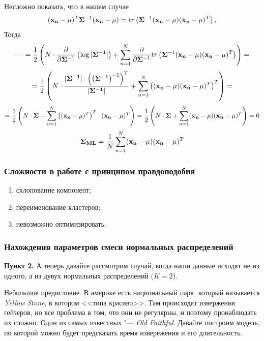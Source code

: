 \begin{Solution}
\[ \]
Несложно показать, что в нашем случае 
\[
({\bf x_n} -\mu)^T {\bf {\bf \Sigma}}^{-1} ({\bf x_n} -\mu) = tr\left({\bf {\bf \Sigma}}^{-1} ({\bf x_n} -\mu)({\bf x_n} -\mu)^T\right), 
\]
Тогда
\[
\dots = 
  \frac{1}{2} \left(N \cdot \frac{\partial}{\partial {\bf \Sigma}^{-1}} \left(\log |{\bf {\bf \Sigma}^{-1}}|\right) +  \sum\limits_{n=1}^{N}\frac{\partial}{\partial {\bf \Sigma}^{-1}} tr\left({\bf {\bf \Sigma}}^{-1} ({\bf x_n} -\mu)({\bf x_n} -\mu)^T\right) \right) =
\]
\[
= \frac{1}{2} \left(N \cdot \frac{|{\bf {\bf \Sigma}^{-1}}| \cdot \left(\left( {\bf {\bf \Sigma}^{-1}}\right)^{-1}\right)^T }{|{\bf {\bf \Sigma}^{-1}}|}
+  \sum\limits_{n=1}^{N} \left(({\bf x_n} -\mu)({\bf x_n} -\mu)^T\right)^T \right) =
\]
\[ =
\frac{1}{2} \left(N \cdot {\bf {\bf \Sigma}} + \sum\limits_{n=1}^{N}\left(({\bf x_n} -\mu)^T\right)^T \cdot ({\bf x_n} -\mu)^T \right)= 
\frac{1}{2}\left(N \cdot {\bf {\bf \Sigma}}  + \sum\limits_{n=1}^{N}({\bf x_n} -\mu)({\bf x_n} -\mu)^T \right) = 0
\]
\[
{\bf {\bf \Sigma}_{ML}} = \frac{1}{N} \sum\limits_{n=1}^{N}({\bf x_n} -\mu)({\bf x_n} -\mu)^T
\]
\end{Solution}

\subsubsection{Сложности в работе с принципом правдоподобия}
\begin{enumerate}
\item схлопование компонент;
\item переименование кластеров;
\item невозможно оптимизировать.
\end{enumerate}

\subsubsection{Нахождения параметров смеси нормальных распределений}
{\bf Пункт 2.} А теперь давайте рассмотрим случай, когда наши данные исходят не из одного, а из дувух нормальных распределений ($K = 2$). 

Небольшое предисловие. В америке есть национальный парк, который называется {\it Yellow Stone}, в котором <<типа красиво>>. Там происходят извержения гейзеров, но все проблема в том, что они не регулярны, и поэтому пронаблюдать их сложно. Один из самых известных "--- {\it Old Faithful}. Давайте построим модель, по которой можно будет предсказать время извережения и его длительность.

